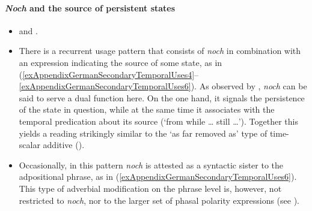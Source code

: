 \paragraph{\textit{Noch} and the source of persistent states}\label{appendixGermanSourcePersistentState}
\begin{itemize}
	\item \textcite{Mustajoki1988} and \textcite{Shetter1966}.
	\item There is a recurrent usage pattern that consists of \textit{noch} in combination with an expression indicating the source of some state, as in (\ref{exAppendixGermanSecondaryTemporalUses4}– \ref{exAppendixGermanSecondaryTemporalUses6}). As observed by \textcite{Shetter1966}, \textit{noch} can be said to serve a dual function here. On the one hand, it signals the persistence of the state in question, while at the same time it associates with the temporal predication about its source (\lq from while … still …\rq{}). Together this yields a reading strikingly similar to the \lq as far removed as\rq{ }type of time-scalar additive ().
	\item Occasionally, in this pattern \textit{noch} is attested as a syntactic sister to the adpositional phrase, as in (\ref{exAppendixGermanSecondaryTemporalUses6}). This type of adverbial modification on the phrase level is, however, not restricted to \textit{noch}, nor to the larger set of phasal polarity expressions (see \cite[2091–2096]{ZifonunEtAl1997}).	
\end{itemize}
\largerpage[2.25]
